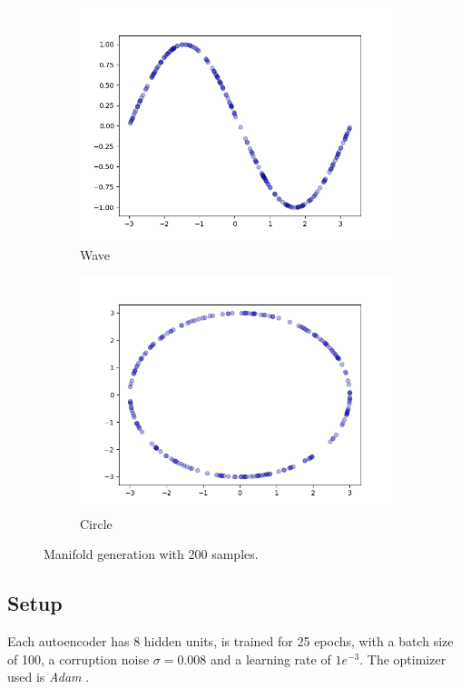 \begin{figure}[!h]
\centering
\begin{subfigure}{.5\textwidth}
  \centering
  \includegraphics[width=.95\linewidth]{figures/wave-manifold}
  \caption{Wave}
\end{subfigure}%
\begin{subfigure}{.5\textwidth}
  \centering
  \includegraphics[width=.95\linewidth]{figures/circle-manifold}
  \caption{Circle}
\end{subfigure}
\caption{Manifold generation with 200 samples.}
\label{fig:generate-manifold}
\end{figure}

\subsection*{Setup}
Each autoencoder has 8 hidden units, is trained for 25 epochs, with a batch size of 100, a corruption noise $\sigma = 0.008$ and a learning rate of $1e^{-3}$. The optimizer used is \textit{Adam} \citep{kingma}.

